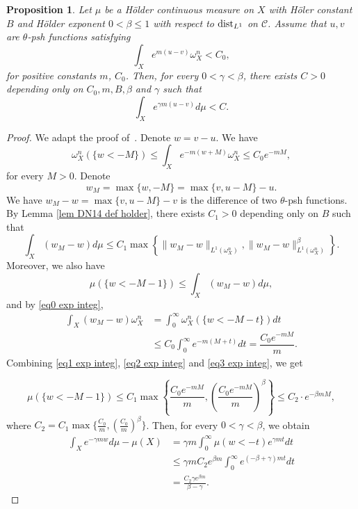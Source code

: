 \documentclass[a4paper,11pt]{amsart}
\numberwithin{equation}{section}
\newtheorem{proposition}[theorem]{Proposition}
\theoremstyle{definition}
\begin{document}
\begin{proposition}\label{prop exp integrable}
	Let $\mu$ be a H\"older continuous measure on $X$
	with H\"oler constant $B$ and H\"older exponent $0<\beta\leq 1$ with respect to ${\rm dist}_{L^1}$ on $\mathcal{C}$. Assume that
	$u, v$ are $\theta$-psh functions satisfying
	\begin{equation*}
	    \int_Xe^{m(u- v)}\omega_X^n<C_0,
	\end{equation*}
for positive constants $m$, $C_0$. Then, for every $0<\gamma<\beta$, there exists $C>0$ depending only on $C_0, 
m, B,\beta$ and $\gamma$ such that
\begin{equation*}
    \int_Xe^{\gamma m(u-v)}d\mu<C.
\end{equation*}
\end{proposition}
\begin{proof} We adapt the proof of~\cite[Proposition 4.4]{dinh2014characterization}.
	Denote $w=v-u$. We have
	\begin{equation}\label{eq0 exp integ}
		\omega_X^n(\{w<-M\})\leq\int_Xe^{-m(w+M)}\omega_X^n\leq C_0e^{-mM},
	\end{equation}
for every $M>0$. Denote 
	$$w_M=\max\{w, -M \}=\max\{v, u-M\}-u.$$
We have $w_M-w=\max\{v, u-M\}-v$ is the difference of two $\theta$-psh functions. 
By Lemma \ref{lem DN14 def holder}, there exists $C_1>0$ depending only on $B$ such that
\begin{equation}\label{eq1 exp integ}
\int_X(w_M-w)d\mu\leq C_1\max\left\{\|w_M-w\|_{L^1(\omega_X^n)}, \|w_M-w\|_{L^1(\omega_X^n)}^{\beta} \right\}.
\end{equation}
Moreover, we also have
\begin{equation}\label{eq2 exp integ}
\mu(\{w<-M-1\})\leq\int_X(w_M-w)d\mu,
\end{equation}
and by \eqref{eq0 exp integ}, 
\begin{equation}\label{eq3 exp integ}
\begin{split}
    \int_X(w_M-w)\omega_X^n&=\int_0^{\infty}\omega_X^n(\{w<-M-t\})dt\\
    &\leq C_0\int_0^{\infty}e^{-m(M+t)}dt
=\dfrac{C_0e^{-mM}}{m}.
\end{split}
\end{equation}
Combining \eqref{eq1 exp integ}, \eqref{eq2 exp integ} and \eqref{eq3 exp integ}, we get

$$	\mu(\{w<-M-1\})\leq C_1\max\left\{\dfrac{C_0e^{-mM}}{m}, \left(\dfrac{C_0e^{-mM}}{m}\right)^{\beta}\right\}
	\leq C_2\cdot e^{-\beta mM},$$
where $C_2=C_1\max\{\frac{C_0}{m}, (\frac{C_0}{m})^{\beta}\}$. Then, for every $0<\gamma<\beta$, we obtain
\begin{align*}
	\int_Xe^{-\gamma m w}d\mu-\mu (X)
	&=\gamma m\int_0^{\infty}\mu(w<-t)e^{\gamma m t}dt\\
	&\leq 	\gamma m C_2e^{\beta m}\int_0^{\infty}e^{(-\beta+\gamma)m t}dt\\
	&=\frac{C_2\gamma e^{\beta m}}{\beta-\gamma}.
\end{align*}
\end{proof}
\end{document}
